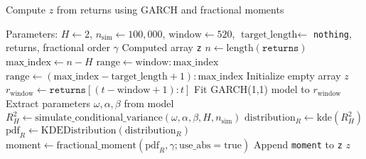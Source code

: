 \begin{algorithm}
\caption{Compute $z$ from returns using GARCH and fractional moments}
\label{alg:compute_z}
\begin{algorithmic}[1]
\REQUIRE Parameters: $H \gets 2$, $n_{\text{sim}} \gets 100{,}000$, $\text{window} \gets 520$, $\text{target\_length} \gets$ \texttt{nothing}, returns, fractional order $\gamma$
\ENSURE Computed array \texttt{z}
\STATE 
\STATE $n \gets \text{length}(\texttt{returns})$
\STATE $\text{max\_index} \gets n - H$
    \STATE $\text{range} \gets \text{window} : \text{max\_index}$
\ELSE
    \STATE $\text{range} \gets (\text{max\_index} - \text{target\_length} + 1) : \text{max\_index}$
\ENDIF
\STATE Initialize empty array $z$
    \STATE $r_{\text{window}} \gets \texttt{returns}[(t - \text{window} + 1) : t]$
    \STATE Fit GARCH(1,1) model to $r_{\text{window}}$
    \STATE Extract parameters $\omega, \alpha, \beta$ from model
    \STATE $R_{H}^{2} \gets \text{simulate\_conditional\_variance}(\omega, \alpha, \beta, H, n_{\text{sim}})$
    \STATE $\text{distribution}_R \gets \text{kde}(R_{H}^{2})$
    \STATE $\text{pdf}_R \gets \text{KDEDistribution}(\text{distribution}_R)$
    \STATE $\text{moment} \gets \text{fractional\_moment}(\text{pdf}_R, \gamma; \text{use\_abs} = \text{true})$
    \STATE Append \texttt{moment} to \texttt{z}
\ENDFOR
\RETURN $z$
\end{algorithmic}
\end{algorithm}

\clearpage
